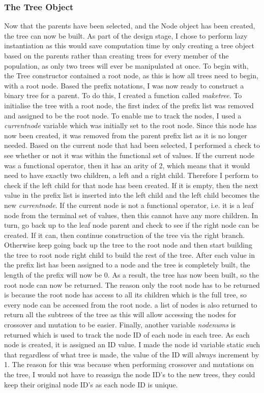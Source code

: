 \documentclass[11pt]{article}
\begin{document}
\subsubsection{The Tree Object}
Now that the parents have been selected, and the Node object has been created, the tree can now be built. As part of the design stage, I chose to perform lazy instantiation as this would save computation time by only creating a tree object based on the parents rather than creating trees for every member of the population, as only two trees will ever be manipulated at once. To begin with, the Tree constructor contained a root node, as this is how all trees need to begin, with a root node. 
Based the prefix notations, I was now ready to construct a binary tree for a parent. To do this, I created a function called \textit{make\textunderscore tree}. To initialise the tree with a root node, the first index of the prefix list was removed and assigned to be the root node. To enable me to track the nodes, I used a \textit{current\textunderscore node} variable which was initially set to the root node. Since this node has now been created, it was removed from the parent prefix list as it is no longer needed. Based on the current node that had been selected, I performed a check to see whether or not it was within the functional set of values. If the current node was a functional operator, then it has an arity of 2, which means that it would need to have exactly two children, a left and a right child. Therefore I perform to check if the left child for that node has been created. If it is empty, then the next value in the prefix list is inserted into the left child and the left child becomes the new \textit{current\textunderscore node}. If the current node is not a functional operator, i.e. it is a leaf node from the terminal set of values, then this cannot have any more children. In turn, go back up to the leaf node parent and check to see if the right node can be created. If it can, then continue construction of the tree via the right branch. Otherwise keep going back up the tree to the root node and then start building the tree to root node right child to build the rest of the tree. After each value in the prefix list has been assigned to a node and the tree is completely built, the length of the prefix will now be 0. As a result, the tree has now been built, so the root node can now be returned. The reason only the root node has to be returned is because the root node has access to all its children which is the full tree, so every node can be accessed from the root node. a list of nodes is also returned to return all the subtrees of the tree as this will allow accessing the nodes for crossover and mutation to be easier. Finally, another variable \textit{nodenums} is returned which is used to track the node ID of each node in each tree. As each node is created, it is assigned an ID value. I made the node id variable static such that regardless of what tree is made, the value of the ID will always increment by 1. The reason for this was because when performing crossover and mutations on the tree, I would not have to reassign the node ID's to the new trees, they could keep their original node ID's as each node ID is unique.
\end{document}
